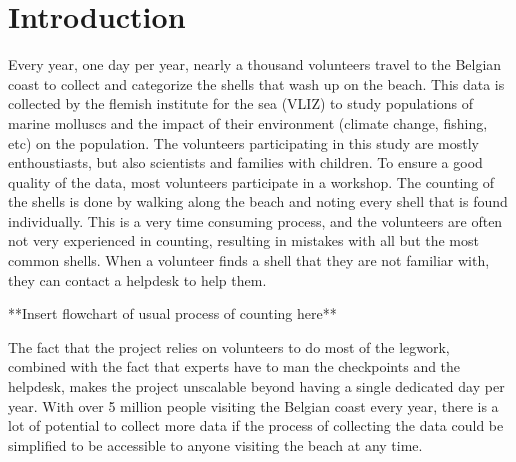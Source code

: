 
\chapter{Introduction}

Every year, one day per year, nearly a thousand volunteers travel to the Belgian coast to collect and categorize the shells that wash up on the beach. This data is collected by the flemish institute for the sea (VLIZ) to study populations of marine molluscs and the impact of their environment (climate change, fishing, etc) on the population. The volunteers participating in this study are mostly enthoustiasts, but also scientists and families with children. To ensure a good quality of the data, most volunteers participate in a workshop. The counting of the shells is done by walking along the beach and noting every shell that is found individually. This is a very time consuming process, and the volunteers are often not very experienced in counting, resulting in mistakes with all but the most common shells. When a volunteer finds a shell that they are not familiar with, they can contact a helpdesk to help them.

**Insert flowchart of usual process of counting here**

The fact that the project relies on volunteers to do most of the legwork, combined with the fact that experts have to man the checkpoints and the helpdesk, makes the project unscalable beyond having a single dedicated day per year. With over 5 million people
visiting the Belgian coast every year, there is a lot of potential to collect more data if the process of collecting the data could be simplified to be accessible to anyone visiting the beach at any time.

